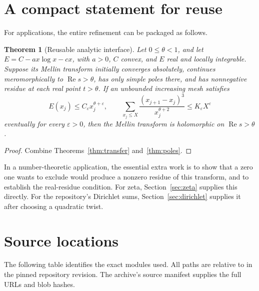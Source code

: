 \documentclass[11pt]{article}
\newtheorem{theorem}{Theorem}[section]
\theoremstyle{definition}
\newcommand{\ep}{\varepsilon}
\newcommand{\Rea}{\operatorname{Re}}
\begin{document}
\appendix
\section{A compact statement for reuse}

For applications, the entire refinement can be packaged as follows.

\begin{theorem}[Reusable analytic interface]\label{thm:reuse}
Let \(0\leq\theta<1\), and let \(E=C-ax\log x-cx\), with \(a>0\),
\(C\) convex, and \(E\) real and locally integrable. Suppose its Mellin
transform initially converges absolutely, continues meromorphically to
\(\Rea s>\theta\), has only simple poles there, and has nonnegative
residue at each real point \(t>\theta\). If an unbounded increasing
mesh satisfies
\[
 E(x_j)\leq C_\ep x_j^{\theta+\ep},\qquad
 \sum_{x_j\leq X}\frac{(x_{j+1}-x_j)^3}{x_j^{\theta+2}}
       \leq K_\ep X^\ep
\]
eventually for every \(\ep>0\), then the Mellin transform is
holomorphic on \(\Rea s>\theta\).
\end{theorem}
\begin{proof}
Combine Theorems~\ref{thm:transfer} and~\ref{thm:poles}.
\end{proof}

In a number-theoretic application, the essential extra work is to show
that a zero one wants to exclude would produce a nonzero residue of
this transform, and to establish the real-residue condition. For zeta,
Section~\ref{sec:zeta} supplies this directly. For the repository's
Dirichlet sums, Section~\ref{sec:dirichlet} supplies it after choosing a
quadratic twist.

\section{Source locations}

The following table identifies the exact modules used. All paths are
relative to  in the pinned repository revision.
The archive's source manifest supplies the full URLs and blob hashes.
\end{document}
